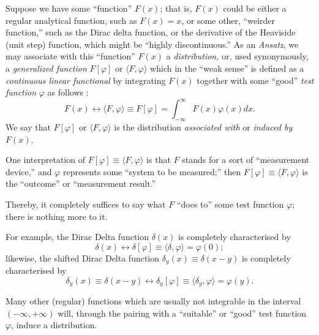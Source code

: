 Suppose we have some ``function'' $F(x)$; that is, $F(x)$ could be either
a regular analytical function, such as $F(x)=x$,
or some other, ``weirder function,'' such as the Dirac delta function,
or the derivative of the Heaviside (unit step) function, which might be ``highly discontinuous.''
As an {\it Ansatz},  we may associate with this ``function'' $F(x)$
a
{\em distribution,}
or, used synonymously,
a
{\em generalized function}
$F[\varphi ]$
or $\langle F , \varphi \rangle $
which
in the ``weak sense'' is  defined as a {\em continuous linear functional}
by integrating $F(x)$ together with some ``good'' {\em test function} $\varphi$
as follows \cite{schwartz}:
\begin{equation}
 F(x) \longleftrightarrow \langle F , \varphi \rangle \equiv F[\varphi] =\int_{-\infty}^{\infty} F(x) \varphi (x) dx.
\end{equation}
We say that $F[\varphi ]$ or $\langle F , \varphi \rangle $ is the distribution {\em associated with}
or {\em induced by}
$F(x)$.


One interpretation of
$F[\varphi ]\equiv \langle F , \varphi \rangle $
is that  $F$ stands for a sort of ``measurement device,''
and $\varphi$ represents some ``system to be measured;''
then
$F[\varphi ]\equiv \langle F , \varphi \rangle $
is the ``outcome'' or ``measurement result.''

Thereby, it completely suffices to say what $F$ ``does to'' some test function $\varphi$; there is nothing more to it.

{
\color{blue}
\bexample
For example, the Dirac Delta function $\delta(x)$ is completely characterised by
$$\delta(x)  \longleftrightarrow \delta [\varphi ]\equiv \langle \delta , \varphi \rangle =\varphi (0);$$
likewise,
the shifted Dirac Delta function $\delta_y(x)\equiv \delta (x-y)$ is completely characterised by
$$\delta_y (x) \equiv \delta(x-y) \longleftrightarrow \delta_y
[\varphi ]\equiv \langle \delta_y , \varphi \rangle =\varphi (y).$$
\eexample
}

Many other (regular) functions which are usually not integrable in the interval
$( -\infty , +\infty )$ will, through the pairing with a
``suitable'' or ``good'' test function $\varphi$,
induce a distribution.

